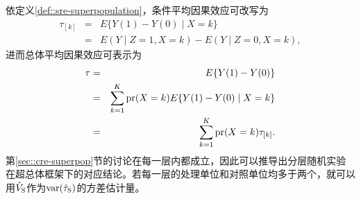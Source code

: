 依定义\ref{def::sre-superpopulation}，条件平均因果效应可改写为
\begin{eqnarray*}
\tau_{[k]}  &=&  E\{   Y(1) -  Y(0)  \mid X= k \} \\
&=& E(Y\mid Z=1, X=k) - E(Y\mid Z=0, X=k),
\end{eqnarray*}
进而总体平均因果效应可表示为
\begin{eqnarray*}
\tau &=&   E\{   Y(1) -  Y(0)   \}  \\
&=& \sum_{k=1}^K \textup{pr}(X = k) E\{   Y(1) -  Y(0)  \mid X = k \} \\
&=& \sum_{k=1}^K \textup{pr}(X  = k) \tau_{[k]} .
\end{eqnarray*}
%
第\ref{sec::cre-superpop}节的讨论在每一层内都成立，因此可以推导出分层随机实验在超总体框架下的对应结论。若每一层的处理单位和对照单位均多于两个，就可以用$\hat{V}_\textsc{S}$作为$\textup{var}( \hat{\tau}_\textsc{S} )$的方差估计量。 


%  
%  


